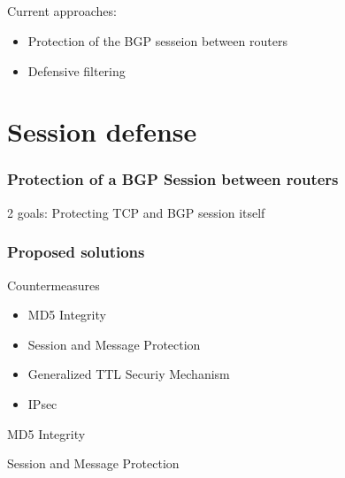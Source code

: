 \documentclass[notes=hide,yellow]{beamer}
\begin{document}
\subsection*{}
\begin{frame}
	Current approaches: 
	\begin{itemize}
		\item Protection of the BGP sesseion between routers
		\item Defensive filtering
	\end{itemize}
\end{frame}

\section{Session defense}

\begin{frame}
	\frametitle{Protection of a BGP Session between routers}
	2 goals: Protecting TCP and BGP session itself
\end{frame}


\begin{frame}
	\frametitle{Proposed solutions}
	\begin{block}{Countermeasures}
	\begin{itemize}
		\item MD5 Integrity
		\item Session and Message Protection
		\item Generalized TTL Securiy Mechanism
		\item IPsec
	\end{itemize}
	\end{block}

\end{frame}


\begin{frame}{MD5 Integrity}
	
%
\end{frame}

\begin{frame}{Session and Message Protection}
%
\end{frame}
\end{document}
